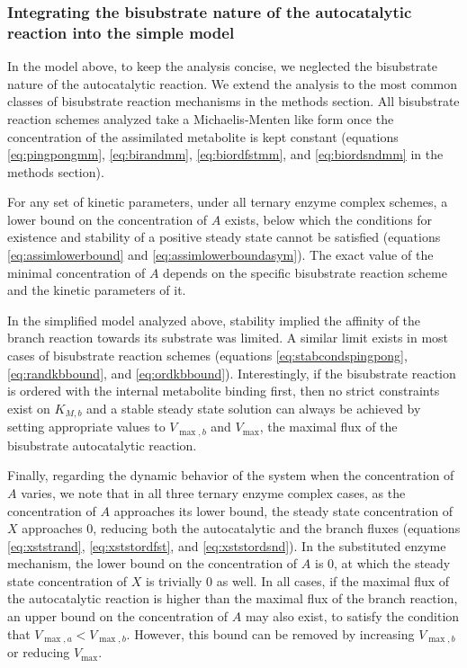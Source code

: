     \subsubsection{Integrating the bisubstrate nature of the autocatalytic reaction into the simple model}
    In the model above, to keep the analysis concise, we neglected the bisubstrate nature of the autocatalytic reaction.
    We extend the analysis to the most common classes of bisubstrate reaction mechanisms in the methods section.
    All bisubstrate reaction schemes analyzed take a Michaelis-Menten like form once the concentration of the assimilated metabolite is kept constant (equations \ref{eq:pingpongmm}, \ref{eq:birandmm}, \ref{eq:biordfstmm}, and \ref{eq:biordsndmm} in the methods section).

    For any set of kinetic parameters, under all ternary enzyme complex schemes, a lower bound on the concentration of $A$ exists, below which the conditions for existence and stability of a positive steady state cannot be satisfied (equations \ref{eq:assimlowerbound} and \ref{eq:assimlowerboundasym}).
    The exact value of the minimal concentration of $A$ depends on the specific bisubstrate reaction scheme and the kinetic parameters of it.

    In the simplified model analyzed above, stability implied the affinity of the branch reaction towards its substrate was limited.
    A similar limit exists in most cases of bisubstrate reaction schemes (equations \ref{eq:stabcondspingpong}, \ref{eq:randkbbound}, and \ref{eq:ordkbbound}).
    Interestingly, if the bisubstrate reaction is ordered with the internal metabolite binding first, then no strict constraints exist on $K_{M,b}$ and a stable steady state solution can always be achieved by setting appropriate values to $V_{\max,b}$ and $V_{\max}$, the maximal flux of the bisubstrate autocatalytic reaction.

    Finally, regarding the dynamic behavior of the system when the concentration of $A$ varies, we note that in all three ternary enzyme complex cases, as the concentration of $A$ approaches its lower bound, the steady state concentration of $X$ approaches $0$, reducing both the autocatalytic and the branch fluxes (equations \ref{eq:xststrand}, \ref{eq:xststordfst}, and \ref{eq:xststordsnd}).
    In the substituted enzyme mechanism, the lower bound on the concentration of $A$ is 0, at which the steady state concentration of $X$ is trivially 0 as well.
    In all cases, if the maximal flux of the autocatalytic reaction is higher than the maximal flux of the branch reaction, an upper bound on the concentration of $A$ may also exist, to satisfy the condition that $V_{\max,a}<V_{\max,b}$.
    However, this bound can be removed by increasing $V_{\max,b}$ or reducing $V_{\max}$.

